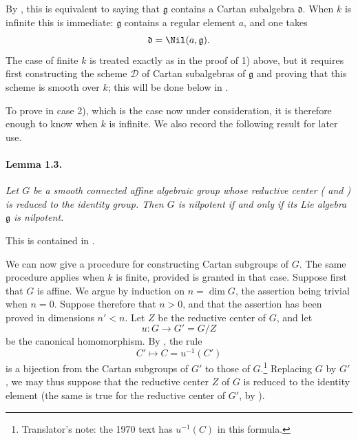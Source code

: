By , this is equivalent to saying that \(\mathfrak g\)
contains a Cartan subalgebra \(\mathfrak d\). When \(k\) is infinite
this is immediate: \(\mathfrak g\) contains a regular element \(a\),
and one takes
\[
  \mathfrak d=\Nil(a,\mathfrak g).
\]
The case of finite \(k\) is treated exactly as in the proof of
\textup{1\textdegree)} above, but it requires first constructing the
scheme \(\mathcal D\) of Cartan subalgebras of \(\mathfrak g\) and
proving that this scheme is smooth over \(k\); this will be done
below in .

To prove  in case \textup{2\textdegree)}, which is the case now
under consideration, it is therefore enough to know  when \(k\)
is infinite. We also record the following result for later use.

\paragraph{\textbf{Lemma 1.3.}}
\emph{Let \(G\) be a smooth connected affine algebraic group whose
reductive center \textup{( and )} is reduced to the identity
group. Then \(G\) is nilpotent if and only if its Lie algebra
\(\mathfrak g\) is nilpotent.}

This is contained in .

We can now give a procedure for constructing Cartan subgroups of
\(G\). The same procedure applies when \(k\) is finite, provided
 is granted in that case. Suppose first that \(G\) is
affine. We argue by induction on \(n=\dim G\), the assertion being
trivial when \(n=0\). Suppose therefore that \(n>0\), and that the
assertion has been proved in dimensions \(n'<n\). Let \(Z\) be the
reductive center of \(G\), and let
\[
  u\colon G\longrightarrow G'=G/Z
\]
be the canonical homomorphism. By , the rule
\[
  C'\longmapsto C=u^{-1}(C')
\]
is a bijection from the Cartan subgroups of \(G'\) to those of
\(G\).\footnote{Translator's note: the 1970 text has \(u^{-1}(C)\) in this formula.} Replacing \(G\) by \(G'\), we may thus suppose that the
reductive center \(Z\) of \(G\) is reduced to the identity element
\textup{(the same is true for the reductive center of \(G'\), by
)}.

